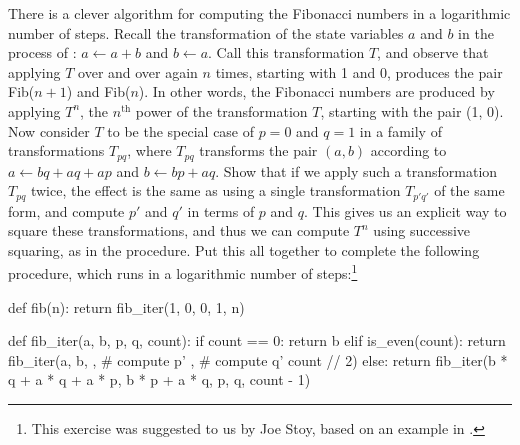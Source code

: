 \begin{exerciseGroup}
\label{Exercise 1.19}
 There is a clever algorithm for
computing the Fibonacci numbers in a logarithmic number of steps.  Recall the
transformation of the state variables \( a \) and \( b \) in the 
process of : \( a \gets a + b \) and \( b \gets a \).
Call this transformation \( T \), and observe that applying \( T \) over and over
again \( n \) times, starting with 1 and 0, produces the pair Fib(\( n+1 \)) and
Fib(\( n \)).  In other words, the Fibonacci numbers are produced
by applying \( T^n \), the \( n^{\mathrm{th}} \) power of the transformation \( T \),
starting with the pair (1, 0).  Now consider \( T \) to be the special case of
\( p=0 \) and \( q=1 \) in a family of transformations \( T_{pq} \),
where \( T_{pq} \) transforms the pair \( (a, b) \) according to
\( a \gets bq + aq + ap \) and \( b \gets bp + aq \).
Show that if we apply such a transformation \( T_{pq} \) twice, the
effect is the same as using a single transformation \( T_{p'\!q'} \) of the
same form, and compute \( p'\! \) and \( q'\! \) in terms of \( p \) and \( q \).  This
gives us an explicit way to square these transformations, and thus we can
compute \( T^n \) using successive squaring, as in the 
procedure.  Put this all together to complete the following procedure, which
runs in a logarithmic number of steps:\footnote{This exercise was suggested to
us by Joe Stoy, based on an example in .}

\begin{syntaxForm}
def fib(n):
    return fib_iter(1, 0, 0, 1, n)

def fib_iter(a, b, p, q, count):
    if count == 0:
        return b
    elif is_even(count):
        return fib_iter(a,
                        b,
                        ,      # compute p'
                        ,      # compute q'
                        count // 2)
    else:
        return fib_iter(b * q + a * q + a * p,
                        b * p + a * q,
                        p,
                        q,
                        count - 1)
\end{syntaxForm}
\end{exerciseGroup}

